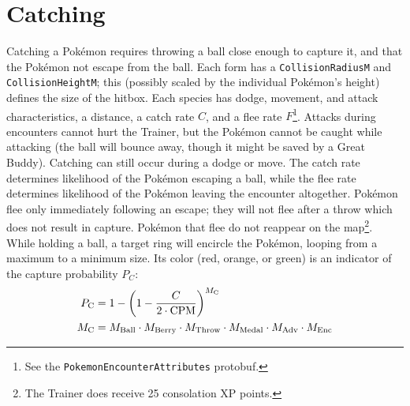 \section{Catching\label{sec:catch}}
Catching a Pokémon requires throwing a ball close enough to capture it,
 and that the Pokémon not escape from the ball.
Each form has a \texttt{CollisionRadiusM} and \texttt{CollisionHeightM}; this (possibly scaled by
 the individual Pokémon's height) defines the size of the hitbox.
Each species has dodge, movement, and attack characteristics, a distance, a catch rate $C$, and a flee rate
 $F$\footnote{See the \texttt{PokemonEncounterAttributes} protobuf.}.
Attacks during encounters cannot hurt the Trainer, but the Pokémon cannot be caught
  while attacking (the ball will bounce away, though it might be saved by a Great Buddy).
Catching can still occur during a dodge or move.
The catch rate determines likelihood of the Pokémon escaping a ball,
  while the flee rate determines likelihood of the Pokémon leaving the encounter altogether.
Pokémon flee only immediately following an escape; they will not flee after a throw which
  does not result in capture.
Pokémon that flee do not reappear on the map\footnote{The Trainer does receive 25 consolation XP points.}.
While holding a ball, a target ring will encircle the Pokémon, looping from a maximum to a minimum size.
Its color (red, orange, or green) is an indicator of the capture probability $P_C$:
\begin{align*}
  P_\mathrm{C} &= 1-\left(1 - \frac{C}{2\cdot{}\mbox{$\mathrm{CPM}$}}\right)^{M_\mathrm{C}}\\
  M_\mathrm{C} &= M_\mathrm{Ball} \cdot M_\mathrm{Berry} \cdot M_\mathrm{Throw} \cdot M_\mathrm{Medal} \cdot M_\mathrm{Adv} \cdot M_\mathrm{Enc}
\end{align*}
